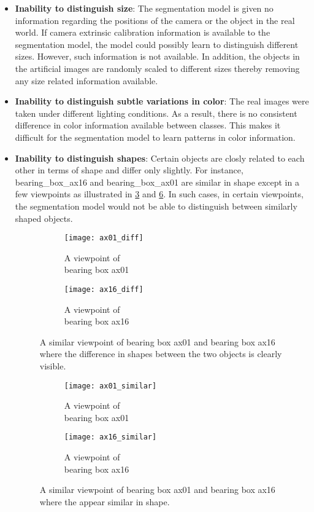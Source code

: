 \documentclass[paper=a4,11pt,parskip=half,toc=listof]{scrartcl}
\begin{document}
		\begin{itemize}
			\item \textbf{Inability to distinguish size}: The segmentation model is given no information regarding the positions of the camera or the object in the real world. If camera extrinsic calibration information is available to the segmentation model, the model could possibly learn to distinguish different sizes. However, such information is not available. In addition, the objects in the artificial images are randomly scaled to different sizes thereby removing any size related information available.
			\item \textbf{Inability to distinguish subtle variations in color}: The real images were taken under different lighting conditions. As a result, there is no consistent difference in color information available between classes. This makes it difficult for the segmentation model to learn patterns in color information.
			\item \textbf{Inability to distinguish shapes}: Certain objects are closly related to each other in terms of shape and differ only slightly. For instance, bearing\_box\_ax16 and bearing\_box\_ax01 are similar in shape except in a few viewpoints as illustrated in \ref{Fig:8} and \ref{Fig:9}. In such cases, in certain viewpoints, the segmentation model would not be able to distinguish between similarly shaped objects.
			
\begin{figure}[!htb]
	\centering
	\begin{subfigure}{.3\textwidth}
  		\centering
  		\texttt{[image: ax01\_diff]}
  		\caption{A viewpoint of \\bearing box ax01}
  		\label{Fig:8a}
	\end{subfigure}%
	\begin{subfigure}{.3\textwidth}
  		\centering
  		\texttt{[image: ax16\_diff]}
  		\caption{A viewpoint of \\bearing box ax16}
  		\label{Fig:8b}
	\end{subfigure}%
	\caption{A similar viewpoint of bearing box ax01 and bearing box ax16 where the difference in shapes between the two objects is clearly visible.}
	\label{Fig:8}
\end{figure}

\begin{figure}[!htb]
	\centering
	\begin{subfigure}{.3\textwidth}
  		\centering
  		\texttt{[image: ax01\_similar]}
  		\caption{A viewpoint of \\bearing box ax01}
  		\label{Fig:9a}
	\end{subfigure}%
	\begin{subfigure}{.3\textwidth}
  		\centering
  		\texttt{[image: ax16\_similar]}
  		\caption{A viewpoint of \\bearing box ax16}
  		\label{Fig:9b}
	\end{subfigure}%
	\caption{A similar viewpoint of bearing box ax01 and bearing box ax16 where the appear similar in shape.}
	\label{Fig:9}
\end{figure}	
	\end{itemize}
	
\end{document}
